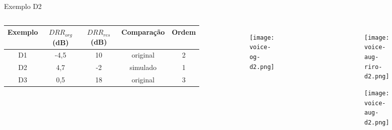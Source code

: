 \begin{frame}{Exemplo D2}
    \begin{columns}

        \begin{table} [H]
            \begin{adjustbox}{width=\columnwidth,center}
                \begin{tabular}{c|c|c|c|c}
            
                    \textbf{Exemplo} & 
                    \textbf{$DRR_{org}$ (dB)} & 
                    \textbf{$DRR_{res}$ (dB)} & 
                    \textbf{Comparação} &
                    \textbf{Ordem} \\
                    \hline 
            
                    D1 & -4,5 & 10 & original & 2 \\
                    D2 & 4,7 & -2 & simulado & 1 \\
                    D3 & 0,5 & 18 & original & 3 \\
            
                \end{tabular}
            \end{adjustbox}
        \end{table}

        \begin{figure}
            \begin{subfigure}{\textwidth}
                \centering
                \texttt{[image: voice-og-d2.png]}
            \end{subfigure}
        \end{figure}

        \begin{figure}
            \begin{subfigure}{\textwidth}
                \centering
                \texttt{[image: voice-aug-riro-d2.png]}
            \end{subfigure}
            \begin{subfigure}{\textwidth}
                \centering
                \texttt{[image: voice-aug-d2.png]}
            \end{subfigure}
        \end{figure}
    \end{columns}
\end{frame}

